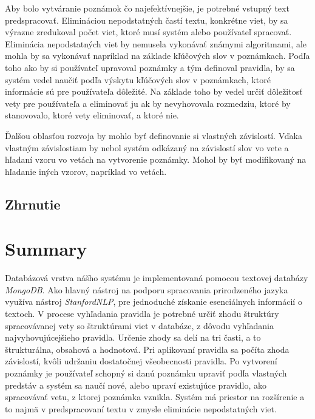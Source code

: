 Aby bolo vytváranie poznámok čo najefektívnejšie, je potrebné vstupný text predspracovať. Elimináciou nepodstatných častí textu, konkrétne viet, by sa výrazne zredukoval počet viet, ktoré musí systém alebo používateľ spracovať. Eliminácia nepodstatných viet by nemusela vykonávať známymi algoritmami, ale mohla by sa vykonávať napríklad na základe kľúčových slov v poznámkach. Podľa toho ako by si používateľ upravoval poznámky a tým definoval pravidla, by sa systém vedel naučiť podľa výskytu kľúčových slov v poznámkach, ktoré informácie sú pre používateľa dôležité. Na základe toho by vedel určiť dôležitosť vety pre používateľa a eliminovať ju ak by nevyhovovala rozmedziu, ktoré by stanovovalo, ktoré vety eliminovať, a ktoré nie.

Ďalšou oblasťou rozvoja by mohlo byť definovanie si vlastných závislostí. Vďaka vlastným závislostiam by nebol systém odkázaný na závislostí slov vo vete a hľadaní vzoru vo vetách na vytvorenie poznámky. Mohol by byť modifikovaný na hľadanie iných vzorov, napríklad vo vetách.

%
%
{
	\subsection{Zhrnutie}
}
{
	\section{Summary}
}
\label{subsection:system_summary}
Databázová vrstva nášho systému je implementovaná pomocou textovej databázy \textit{MongoDB}. Ako hlavný nástroj na podporu spracovania prirodzeného jazyka využíva nástroj \textit{StanfordNLP}, pre jednoduché získanie esenciálnych informácií o textoch. V procese vyhľadania pravidla je potrebné určiť zhodu štruktúry spracovávanej vety so štruktúrami viet v databáze, z dôvodu vyhľadania najvyhovujúcejšieho pravidla. Určenie zhody sa delí na tri časti, a to štrukturálna, obsahová a hodnotová. Pri aplikovaní pravidla sa počíta zhoda závislostí, kvôli udržaniu dostatočnej všeobecnosti pravidla. Po vytvorení poznámky je používateľ schopný si danú poznámku upraviť podľa vlastných predstáv a systém sa naučí nové, alebo upraví existujúce pravidlo, ako spracovávať vetu, z ktorej poznámka vznikla. Systém má priestor na rozšírenie a to najmä v predspracovaní textu v zmysle eliminácie nepodstatných viet. 